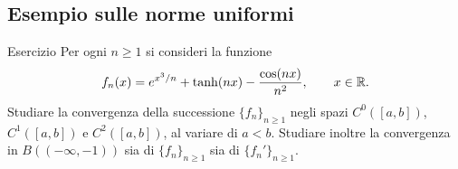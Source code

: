 \documentclass[a4paper]{article}
\begin{document}
\subsection{Esempio sulle norme uniformi}

\begin{radioactive}
\begin{snippetexample}{Esercizio}
Per ogni \(n\geq 1\) si consideri la funzione
\[
	f_n(x)=e^{x^3/n}+\tanh(nx)-\frac{\cos(nx)}{n^2},
	\qquad x\in\mathbb{R}.
\]
Studiare la convergenza della successione \(\{f_n\}_{n\geq 1}\) negli spazi \(C^0([a,b])\), \(C^1([a,b])\) e \(C^2([a,b])\), al variare di \(a<b\). Studiare inoltre la convergenza in \(B(({-\infty},-1))\) sia di \(\{f_n\}_{n\geq 1}\) sia di \(\{f_n'\}_{n\geq 1}\).
\end{snippetexample}
\end{radioactive}
\end{document}
